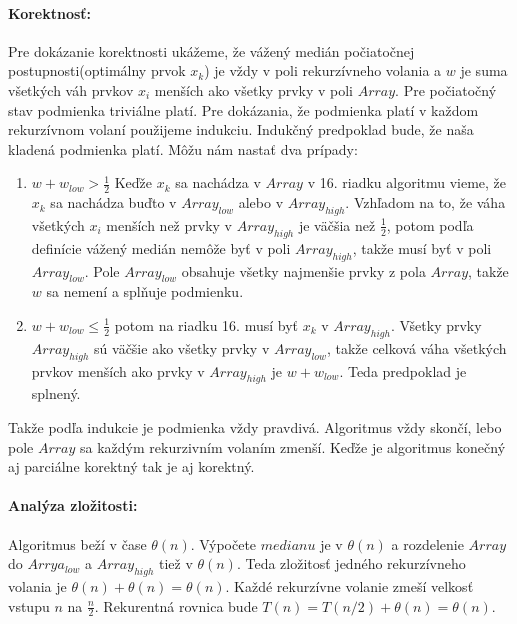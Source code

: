 \documentclass[12pt]{iv003}
\begin{document}
\paragraph{Korektnosť:}
Pre dokázanie korektnosti ukážeme, že vážený medián počiatočnej postupnosti(optimálny prvok $x_{k}$) je vždy v poli rekurzívneho volania a $w$ je suma všetkých váh prvkov $x_{i}$ menších ako všetky prvky v poli $Array$. Pre počiatočný stav podmienka triviálne platí. Pre dokázania, že podmienka platí v každom rekurzívnom volaní použijeme indukciu. Indukčný predpoklad bude, že naša kladená podmienka platí. Môžu nám nastať dva prípady:
\begin{enumerate}
	\item $w + w_{low} > \frac{1}{2}$ Keďže $x_{k}$ sa nachádza v $Array$ v 16. riadku algoritmu vieme, že $x_{k}$ sa nachádza buďto v $Array_{low}$ alebo v $Array_{high}$. Vzhľadom na to, že váha všetkých $x_{i}$ menších než prvky v $Array_{high}$  je väčšia než $\frac{1}{2}$, potom podľa definície vážený medián
	nemôže byť v poli $Array_{high}$, takže musí byť v poli $Array_{low}$. Pole $Array_{low}$ obsahuje všetky najmenšie prvky z pola $Array$, takže $w$ sa nemení a splňuje podmienku.
	\item $w + w_{low} \leq \frac{1}{2}$ potom na riadku 16. musí byť $x_{k}$ v $Array_{high}$. Všetky prvky $Array_{high}$ sú väčšie ako všetky prvky v $Array_{low}$, takže celková váha všetkých prvkov menších ako prvky v $Array_{high}$ je $w + w_{low}$. Teda predpoklad je splnený.

\end{enumerate}

Takže podľa indukcie je podmienka vždy pravdivá. Algoritmus vždy skončí, lebo
pole $Array$ sa každým rekurzivním volaním zmenší. Keďže je algoritmus konečný
aj parciálne korektný tak je aj korektný.

\paragraph{Analýza zložitosti:}
Algoritmus beží v čase $\theta(n)$. Výpočete $medianu$ je v $\theta(n)$ a rozdelenie $Array$ do $Arrya_{low}$ a $Array_{high}$ tiež v $\theta(n)$. Teda zložitosť jedného rekurzívneho volania je $\theta(n) + \theta(n) = \theta(n)$.
Každé rekurzívne volanie zmeší velkosť vstupu $n$ na $\frac{n}{2}$. Rekurentná rovnica
bude $T(n) = T(n/2) +\theta(n) = \theta(n)$.
\end{document}
